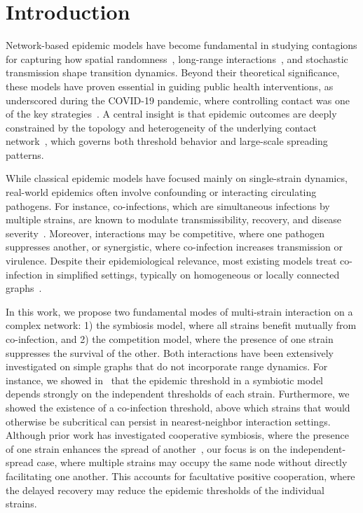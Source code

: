 \documentclass[a4paper,12pt]{scrartcl}
\theoremstyle{plain}%
\theoremstyle{definition}
\theoremstyle{remark}
\numberwithin{equation}{section}
\begin{document}
\section{Introduction}


Network-based epidemic models have become fundamental in studying contagions for capturing how spatial randomness~\cite{gomez2010discrete}, long-range interactions~\cite{estrada2011epidemic,namugera2025long}, and stochastic transmission shape transition dynamics. Beyond their theoretical significance, these models have proven essential in guiding public health interventions, as underscored during the COVID-19 pandemic, where controlling contact was one of the key strategies~\cite{he2020covid}. A central insight is that epidemic outcomes are deeply constrained by the topology and heterogeneity of the underlying contact network~\cite{pastor2001epidemic,newman2002spread,newman2010networks}, which governs both threshold behavior and large-scale spreading patterns.



While classical epidemic models have focused mainly on single-strain dynamics, real-world epidemics often involve confounding or interacting circulating pathogens. For instance, co-infections, which are simultaneous infections by multiple strains, are known to modulate transmissibility, recovery, and disease severity~\cite{oka2020spatial,yang2021epidemic,Namugera2025contact}. Moreover,  interactions may be competitive, where one pathogen suppresses another, or synergistic, where co-infection increases transmission or virulence. Despite their epidemiological relevance, most existing models treat co-infection in simplified settings, typically on homogeneous or locally connected graphs~\cite{funk2010interacting, susi2015co, mclean2018consequences, durrett2020symbiotic}.



In this work, we propose two fundamental modes of multi-strain interaction on a complex network: 1) the symbiosis model, where all strains benefit mutually from co-infection, and 2) the competition model, where the presence of one strain suppresses the survival of the other. Both interactions have been extensively investigated on simple graphs that do not incorporate range dynamics. For instance, we showed in~\cite{Namugera2025contact} that the epidemic threshold in a symbiotic model depends strongly on the independent thresholds of each strain. Furthermore, we showed the existence of a co-infection threshold, above which strains that would otherwise be subcritical can persist in nearest-neighbor interaction settings. Although prior work has investigated cooperative symbiosis, where the presence of one strain enhances the spread of another~\cite{chen2013outbreaks}, our focus is on the independent-spread case, where multiple strains may occupy the same node without directly facilitating one another. This accounts for facultative positive cooperation, where the delayed recovery may reduce the epidemic thresholds of the individual strains. 
\end{document}
